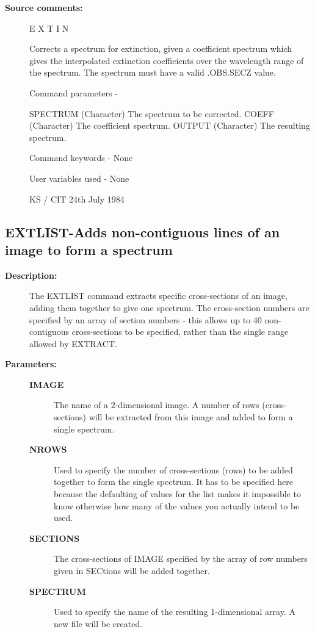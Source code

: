 \begin{description}
\begin{description}
\item [\textbf{Source comments:}]
\begin{terminalv}
 E X T I N

 Corrects a spectrum for extinction, given a coefficient spectrum
 which gives the interpolated extinction coefficients over the
 wavelength range of the spectrum.  The spectrum must have
 a valid .OBS.SECZ value.

 Command parameters -

 SPECTRUM    (Character) The spectrum to be corrected.
 COEFF       (Character) The coefficient spectrum.
 OUTPUT      (Character) The resulting spectrum.

 Command keywords - None

 User variables used - None

                                     KS / CIT 24th July 1984
\end{terminalv}
\end{description}
\subsection{EXTLIST-\label{EXTLIST}Adds non-contiguous lines of an image to form a spectrum}
\begin{description}

\item [\textbf{Description:}]
 The EXTLIST command extracts specific cross-sections of an image,
 adding them together to give one spectrum.  The cross-section
 numbers are specified by an array of section numbers - this allows
 up to 40 non-contiguous cross-sections to be specified, rather
 than the single range allowed by EXTRACT.

\item [\textbf{Parameters:}]
\begin{description}
\item [\textbf{IMAGE}]
 The name of a 2-dimensional image.  A number of rows
 (cross-sections) will be extracted from this image and
 added to form a single spectrum.
\item [\textbf{NROWS}]
 Used to specify the number of cross-sections (rows) to
 be added together to form the single spectrum.
 It has to be specified here because the defaulting of
 values for the list makes it impossible to know otherwise
 how many of the values you actually intend to be used.
\item [\textbf{SECTIONS}]
 The cross-sections of IMAGE specified by the array of
 row numbers given in SECtions will be added together.
\item [\textbf{SPECTRUM}]
 Used to specify the name of the resulting 1-dimensional
 array.  A new file will be created.
\end{description}


\end{description}
\end{description}
